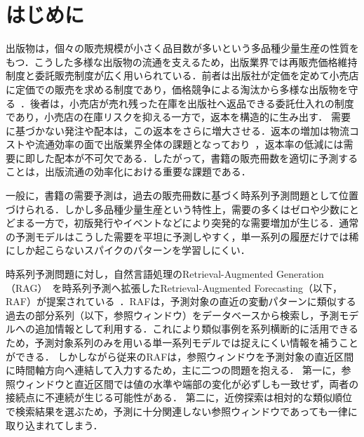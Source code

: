 \documentclass[twocolumn, lastpage]{jarticle}
\begin{document}
\normalsize
\setcounter{page}{1}
\setcounter{secondpage}{1}
\maketitle


\section{はじめに}
出版物は，個々の販売規模が小さく品目数が多いという多品種少量生産の性質をもつ．こうした多様な出版物の流通を支えるため，出版業界では再販売価格維持制度と委託販売制度が広く用いられている．前者は出版社が定価を定めて小売店に定価での販売を求める制度であり，価格競争による淘汰から多様な出版物を守る~\cite{JBPA.2001}．後者は，小売店が売れ残った在庫を出版社へ返品できる委託仕入れの制度であり，小売店の在庫リスクを抑える一方で，返本を構造的に生み出す．
需要に基づかない発注や配本は，この返本をさらに増大させる．返本の増加は物流コストや流通効率の面で出版業界全体の課題となっており~\cite{Shuppan.2024}，返本率の低減には需要に即した配本が不可欠である．したがって，書籍の販売冊数を適切に予測することは，出版流通の効率化における重要な課題である．

一般に，書籍の需要予測は，過去の販売冊数に基づく時系列予測問題として位置づけられる．しかし多品種少量生産という特性上，需要の多くはゼロや少数にとどまる一方で，初版発行やイベントなどにより突発的な需要増加が生じる．通常の予測モデルはこうした需要を平坦に予測しやすく，単一系列の履歴だけでは稀にしか起こらないスパイクのパターンを学習しにくい．

時系列予測問題に対し，自然言語処理のRetrieval-Augmented Generation（RAG）~\cite{Lewis.2020}を時系列予測へ拡張したRetrieval-Augmented Forecasting（以下，RAF）が提案されている~\cite{Tire.2024}．RAFは，予測対象の直近の変動パターンに類似する過去の部分系列（以下，参照ウィンドウ）をデータベースから検索し，予測モデルへの追加情報として利用する．これにより類似事例を系列横断的に活用できるため，予測対象系列のみを用いる単一系列モデルでは捉えにくい情報を補うことができる．
しかしながら従来のRAFは，参照ウィンドウを予測対象の直近区間に時間軸方向へ連結して入力するため，主に二つの問題を抱える．
第一に，参照ウィンドウと直近区間では値の水準や端部の変化が必ずしも一致せず，両者の接続点に不連続が生じる可能性がある．
第二に，近傍探索は相対的な類似順位で検索結果を選ぶため，予測に十分関連しない参照ウィンドウであっても一律に取り込まれてしまう．
\end{document}
